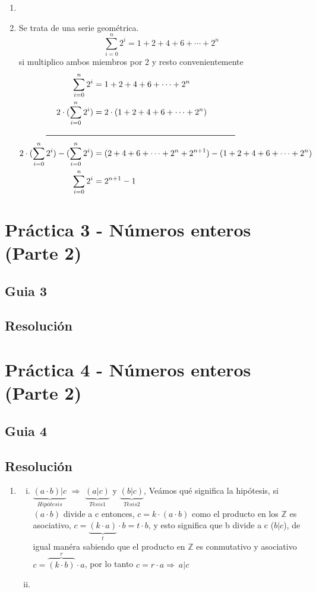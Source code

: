 \documentclass[12pt]{book}
\begin{document}
\begin{enumerate}
\item %
\item %
Se trata de una serie geom\'etrica.
\[ \sum_{i=0}^{n} 2^i = 1+2+4+6+\cdots+2^n\] si multiplico ambos miembros por 2 y resto convenientemente
\begin{align*}
 \sum_{i=0}^{n} 2^i &= 1+2+4+6+\cdots+2^n  \\
  2 \cdot (\sum_{i=0}^{n} 2^i) &= 2\cdot(1+2+4+6+\cdots+2^n) \\
  \rule{20mm}{0.2mm} &  \rule{60mm}{0.2mm} \\
 2 \cdot (\sum_{i=0}^{n} 2^i)-  (\sum_{i=0}^{n} 2^i)  &= (2+4+6+ \cdots +2^n+2^{n+1}) - (1+2+4+6+ \cdots +2^n) \\
 \sum_{i=0}^{n} 2^i &= 2^{n+1} -1
\end{align*}
\end{enumerate}


\chapter{Práctica 3 - Números enteros (Parte 2)}
\section{Guia 3}



\section{Resoluci\'on}



\chapter{Práctica 4 - Números enteros (Parte 2)}
\section{Guia 4}



\section{Resoluci\'on}
\begin{enumerate}
\item %
		\begin{enumerate}[i)]
			\item %
				$  \underbrace{(a \cdot b) | c}_{Hipótesis} $ $\Rightarrow$ $\underbrace{(a | c)}_{Tésis1}$  y $\underbrace{(b | c)}_{Tésis2}$, Veámos qué significa la hipótesis, si $(a \cdot b)$ divide a c entonces, $ c = k \cdot (a\cdot b)$ como el producto en los $\mathbb{Z}$ es asociativo, 
	$ c = \underbrace{(k \cdot a )}_{t} \cdot b = t \cdot b $, y esto significa que b divide a c ($b |c$), de igual manéra sabiendo que el producto en $\mathbb{Z}$ es conmutativo y asociativo $ c = \overbrace{(k \cdot b)}^r \cdot a$, por lo tanto $c = r \cdot a \Rightarrow \ a|c$
			\item %
		\end{enumerate}

\end{enumerate}
\end{document}
